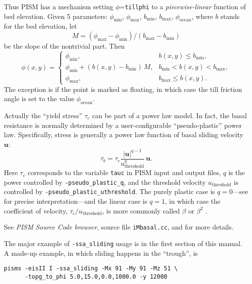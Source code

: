 Thus PISM has a mechanism setting $\phi$=\texttt{tillphi} to a \emph{piecewise-linear} function of bed elevation.  Given 5 parameters: $\phi_{\mathrm{min}}$, $\phi_{\mathrm{max}}$, $b_{\mathrm{min}}$, $b_{\mathrm{max}}$, $\phi_{\mathrm{ocean}}$, where $b$ stands for the bed elevation, let 
\begin{equation}
  M = (\phi_{\text{max}} - \phi_{\text{min}}) / (b_{\text{max}} - b_{\text{min}})\label{eq:1}
\end{equation}
be the slope of the nontrivial part.  Then
\begin{equation}
  \phi(x,y) = \begin{cases}
    \phi_{\text{min}}, & b(x,y) \le b_{\text{min}}, \\
    \phi_{\text{min}} + (b(x,y) - b_{\text{min}}) \,M,
    &  b_{\text{min}} < b(x,y) < b_{\text{max}}, \\
    \phi_{\text{max}}, & b_{\text{max}} \le b(x,y). \end{cases}\label{eq:2}
\end{equation}
The exception is if the point is marked as floating, in which case the till friction angle
is set to the value $\phi_{\mathrm{ocean}}$.

Actually the ``yield stress'' $\tau_c$ can be part of a power law model.  In fact, the basal resistance is normally determined by a user-configurable ``pseudo-plastic'' power law.  Specifically, stress is generally a power law function of basal sliding velocity $\mathbf{u}$:
   $$\tau_b = \tau_c \frac{|\mathbf{u}|^{q-1}}{u_{\text{threshold}}^q}\, \mathbf{u}.$$
Here $\tau_c$ corresponds to the variable \texttt{tauc} in PISM input and output files, $q$ is the power controlled by \texttt{-pseudo_plastic_q}, and the threshold velocity $u_{\text{threshold}}$ is controlled by \texttt{-pseudo_plastic_uthreshold}.  The purely plastic case is $q=0$---see \cite{SchoofStream} for precise interpretation---and the linear case is $q=1$, in which case the coefficient of velocity, $\tau_c/u_{\text{threshold}}$, is more commonly called $\beta$ or $\beta^2$ \cite{MacAyeal}.

See \emph{PISM Source Code browser}, source file \texttt{iMbasal.cc}, and \cite{BBssasliding,BKAJS} for more details.

The major example of \texttt{-ssa_sliding} usage is in the first section of this manual.  A made-up example, in which sliding happens in the ``trough'', is
\begin{verbatim}
pisms -eisII I -ssa_sliding -Mx 91 -My 91 -Mz 51 \
      -topg_to_phi 5.0,15.0,0.0,1000.0 -y 12000
\end{verbatim}

